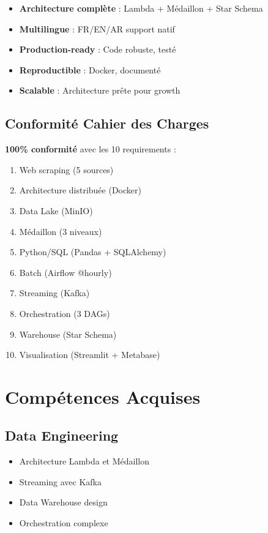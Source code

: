 \documentclass[12pt,a4paper]{report}
\begin{document}
\begin{itemize}
    \item \textbf{Architecture complète} : Lambda + Médaillon + Star Schema
    \item \textbf{Multilingue} : FR/EN/AR support natif
    \item \textbf{Production-ready} : Code robuste, testé
    \item \textbf{Reproductible} : Docker, documenté
    \item \textbf{Scalable} : Architecture prête pour growth
\end{itemize}

\subsection{Conformité Cahier des Charges}

\textbf{100\% conformité} avec les 10 requirements :

\begin{enumerate}
    \item[✓] Web scraping (5 sources)
    \item[✓] Architecture distribuée (Docker)
    \item[✓] Data Lake (MinIO)
    \item[✓] Médaillon (3 niveaux)
    \item[✓] Python/SQL (Pandas + SQLAlchemy)
    \item[✓] Batch (Airflow @hourly)
    \item[✓] Streaming (Kafka)
    \item[✓] Orchestration (3 DAGs)
    \item[✓] Warehouse (Star Schema)
    \item[✓] Visualisation (Streamlit + Metabase)
\end{enumerate}

\section{Compétences Acquises}

\subsection{Data Engineering}

\begin{itemize}
    \item Architecture Lambda et Médaillon
    \item Streaming avec Kafka
    \item Data Warehouse design
    \item Orchestration complexe
\end{itemize}
\end{document}
